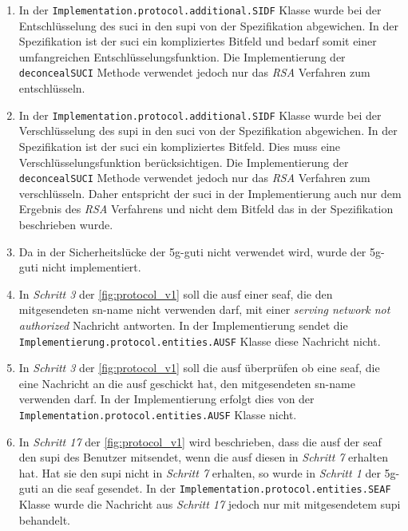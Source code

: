 \begin{enumerate}
\item In der \lstinline{Implementation.protocol.additional.SIDF} Klasse wurde bei der Entschlüsselung des \gls{suci} in den \gls{supi} von der Spezifikation abgewichen.
In der Spezifikation ist der \gls{suci} ein kompliziertes Bitfeld und bedarf somit einer umfangreichen Entschlüsselungsfunktion.
Die Implementierung der \lstinline{deconcealSUCI} Methode verwendet jedoch nur das \textit{RSA} Verfahren zum entschlüsseln.

\item In der \lstinline{Implementation.protocol.additional.SIDF} Klasse wurde bei der Verschlüsselung des \gls{supi} in den \gls{suci} von der Spezifikation abgewichen.
In der Spezifikation ist der \gls{suci} ein kompliziertes Bitfeld. Dies muss eine Verschlüsselungsfunktion berücksichtigen.
Die Implementierung der \lstinline{deconcealSUCI} Methode verwendet jedoch nur das \textit{RSA} Verfahren zum verschlüsseln.
Daher entspricht der \gls{suci} in der Implementierung auch nur dem Ergebnis des \textit{RSA} Verfahrens und nicht dem Bitfeld das in der Spezifikation beschrieben wurde.

\item Da in der Sicherheitslücke der \gls{5g-guti} nicht verwendet wird, wurde der \gls{5g-guti} nicht implementiert.

\item In \textit{Schritt 3} der \cref{fig:protocol_v1} soll die \gls{ausf} einer \gls{seaf}, die den mitgesendeten \gls{sn-name} nicht verwenden darf, mit einer \textit{serving network not authorized} Nachricht antworten.
In der Implementierung sendet die \lstinline{Implementierung.protocol.entities.AUSF} Klasse diese Nachricht nicht.

\item In \textit{Schritt 3} der \cref{fig:protocol_v1} soll die \gls{ausf} überprüfen ob eine \gls{seaf}, die eine Nachricht an die \gls{ausf} geschickt hat, den mitgesendeten \gls{sn-name} verwenden darf.
In der Implementierung erfolgt dies von der \lstinline{Implementation.protocol.entities.AUSF} Klasse nicht.

\item In \textit{Schritt 17} der \cref{fig:protocol_v1} wird beschrieben, dass die \gls{ausf} der \gls{seaf} den \gls{supi} des Benutzer mitsendet, wenn die \gls{ausf} diesen in \textit{Schritt 7} erhalten hat.
Hat sie den \gls{supi} nicht in \textit{Schritt 7} erhalten, so wurde in \textit{Schritt 1} der \gls{5g-guti} an die \gls{seaf} gesendet.
In der \lstinline{Implementation.protocol.entities.SEAF} Klasse wurde die Nachricht aus \textit{Schritt 17} jedoch nur mit mitgesendetem \gls{supi} behandelt.


\end{enumerate}
